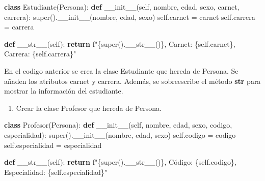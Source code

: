 \documentclass[
  a4paper,
  DIV=11,
  numbers=noendperiod,
  onepage,
  openany]{scrreprt}
\newenvironment{Shaded}{\begin{snugshade}}{\end{snugshade}}
\newcommand{\BuiltInTok}[1]{\textcolor[rgb]{0.00,0.23,0.31}{#1}}
\newcommand{\ControlFlowTok}[1]{\textcolor[rgb]{0.00,0.23,0.31}{\textbf{#1}}}
\newcommand{\FunctionTok}[1]{\textcolor[rgb]{0.28,0.35,0.67}{#1}}
\newcommand{\KeywordTok}[1]{\textcolor[rgb]{0.00,0.23,0.31}{\textbf{#1}}}
\newcommand{\NormalTok}[1]{\textcolor[rgb]{0.00,0.23,0.31}{#1}}
\newcommand{\OperatorTok}[1]{\textcolor[rgb]{0.37,0.37,0.37}{#1}}
\newcommand{\SpecialCharTok}[1]{\textcolor[rgb]{0.37,0.37,0.37}{#1}}
\newcommand{\SpecialStringTok}[1]{\textcolor[rgb]{0.13,0.47,0.30}{#1}}
\newcommand{\VariableTok}[1]{\textcolor[rgb]{0.07,0.07,0.07}{#1}}
\providecommand{\tightlist}{%
  \setlength{\itemsep}{0pt}\setlength{\parskip}{0pt}}\usepackage{longtable,booktabs,array}
\begin{document}
\begin{Shaded}
\begin{Highlighting}[]
\KeywordTok{class}\NormalTok{ Estudiante(Persona):}
    \KeywordTok{def} \FunctionTok{\_\_init\_\_}\NormalTok{(}\VariableTok{self}\NormalTok{, nombre, edad, sexo, carnet, carrera):}
        \BuiltInTok{super}\NormalTok{().}\FunctionTok{\_\_init\_\_}\NormalTok{(nombre, edad, sexo)}
        \VariableTok{self}\NormalTok{.carnet }\OperatorTok{=}\NormalTok{ carnet}
        \VariableTok{self}\NormalTok{.carrera }\OperatorTok{=}\NormalTok{ carrera}

    \KeywordTok{def} \FunctionTok{\_\_str\_\_}\NormalTok{(}\VariableTok{self}\NormalTok{):}
        \ControlFlowTok{return} \SpecialStringTok{f"}\SpecialCharTok{\{}\BuiltInTok{super}\NormalTok{()}\SpecialCharTok{.}\FunctionTok{\_\_str\_\_}\NormalTok{()}\SpecialCharTok{\}}\SpecialStringTok{, Carnet: }\SpecialCharTok{\{}\VariableTok{self}\SpecialCharTok{.}\NormalTok{carnet}\SpecialCharTok{\}}\SpecialStringTok{, Carrera: }\SpecialCharTok{\{}\VariableTok{self}\SpecialCharTok{.}\NormalTok{carrera}\SpecialCharTok{\}}\SpecialStringTok{"}
\end{Highlighting}
\end{Shaded}

En el codigo anterior se crea la clase Estudiante que hereda de Persona.
Se añaden los atributos carnet y carrera. Además, se sobreescribe el
método \textbf{\textbf{str}} para mostrar la información del estudiante.

\begin{enumerate}
\def\labelenumi{\arabic{enumi}.}
\setcounter{enumi}{2}
\tightlist
\item
  Crear la clase Profesor que hereda de Persona.
\end{enumerate}

\begin{Shaded}
\begin{Highlighting}[]
\KeywordTok{class}\NormalTok{ Profesor(Persona):}
    \KeywordTok{def} \FunctionTok{\_\_init\_\_}\NormalTok{(}\VariableTok{self}\NormalTok{, nombre, edad, sexo, codigo, especialidad):}
        \BuiltInTok{super}\NormalTok{().}\FunctionTok{\_\_init\_\_}\NormalTok{(nombre, edad, sexo)}
        \VariableTok{self}\NormalTok{.codigo }\OperatorTok{=}\NormalTok{ codigo}
        \VariableTok{self}\NormalTok{.especialidad }\OperatorTok{=}\NormalTok{ especialidad}

    \KeywordTok{def} \FunctionTok{\_\_str\_\_}\NormalTok{(}\VariableTok{self}\NormalTok{):}
        \ControlFlowTok{return} \SpecialStringTok{f"}\SpecialCharTok{\{}\BuiltInTok{super}\NormalTok{()}\SpecialCharTok{.}\FunctionTok{\_\_str\_\_}\NormalTok{()}\SpecialCharTok{\}}\SpecialStringTok{, Código: }\SpecialCharTok{\{}\VariableTok{self}\SpecialCharTok{.}\NormalTok{codigo}\SpecialCharTok{\}}\SpecialStringTok{, Especialidad: }\SpecialCharTok{\{}\VariableTok{self}\SpecialCharTok{.}\NormalTok{especialidad}\SpecialCharTok{\}}\SpecialStringTok{"}
\end{Highlighting}
\end{Shaded}
\end{document}
